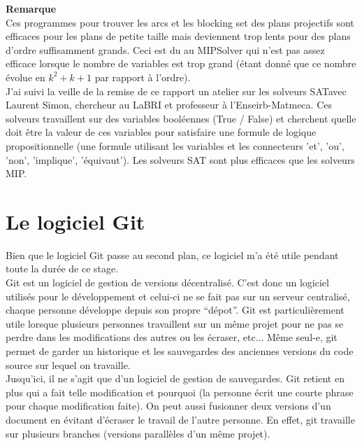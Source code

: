 \documentclass[a4paper]{article}
\begin{document}
\textbf{Remarque}\\
Ces programmes pour trouver les arcs et les blocking set des plans projectifs sont efficaces pour les plans de petite taille mais deviennent trop lents pour des plans d'ordre suffisamment grands. Ceci est du au MIPSolver qui n'est pas assez efficace lorsque le nombre de variables est trop grand (étant donné que ce nombre évolue en $k^2 + k + 1$ par rapport à l'ordre).\\
J'ai suivi la veille de la remise de ce rapport un atelier sur les solveurs SATavec Laurent Simon, chercheur au LaBRI et professeur à l'Enseirb-Matmeca. Ces solveurs travaillent sur des variables booléennes (True / False) et cherchent quelle doit être la valeur de ces variables pour satisfaire une formule de logique propositionnelle (une formule utilisant les variables et les connecteurs 'et', 'ou', 'non', 'implique', 'équivaut'). Les solveurs SAT sont plus efficaces que les solveurs MIP.
\newpage
\section*{Le logiciel Git}
Bien que le logiciel Git passe au second plan, ce logiciel m'a été utile pendant toute la durée de ce stage.\\
Git est un logiciel de gestion de versions décentralisé. C'est donc un logiciel utilisés pour le développement et celui-ci ne se fait pas sur un serveur centralisé, chaque personne développe depuis son propre ``dépot''. Git est particulièrement utile lorsque plusieurs personnes travaillent sur un même projet pour ne pas se perdre dans les modifications des autres ou les écraser, etc... Même seul-e, git permet de garder un historique et les sauvegardes des anciennes versions du code source sur lequel on travaille.\\
Jusqu'ici, il ne s'agit que d'un logiciel de gestion de sauvegardes. Git retient en plus qui a fait telle modification et pourquoi (la personne écrit une courte phrase pour chaque modification faite). On peut aussi fusionner deux versions d'un document en évitant d'écraser le travail de l'autre personne. En effet, git travaille sur plusieurs branches (versions parallèles d'un même projet).\vspace{1\baselineskip}\\
\end{document}
